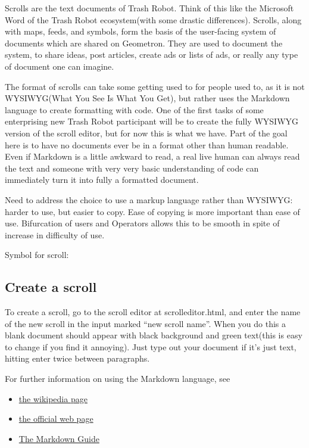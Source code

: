 

Scrolls are the text documents of Trash Robot. Think of this like the
Microsoft Word of the Trash Robot ecosystem(with some drastic
differences). Scrolls, along with maps,
feeds, and symbols, form the basis of the user-facing system of documents which are shared
on Geometron. They are used to document the system, to share ideas, post
articles, create ads or lists of ads, or really any type of document one
can imagine.




The format of scrolls can take some getting used to for people used to,
as it is not WYSIWYG(What You See Is What You Get), but rather uses the
Markdown language to create formatting with code. One of the first tasks
of some enterprising new Trash Robot participant will be to create the
fully WYSIWYG version of the scroll editor, but for now this is what we
have. Part of the goal here is to have no documents ever be in a format
other than human readable. Even if Markdown is a little awkward to read,
a real live human can always read the text and someone with very very
basic understanding of code can immediately turn it into fully a
formatted document.

Need to address the choice to use a markup language rather than WYSIWYG: harder to use, but easier to copy.  Ease of copying is more important than ease of use.  Bifurcation of users and Operators allows this to be smooth in spite of increase in difficulty of use.

Symbol for scroll:


\subsection{Create a scroll}\label{create-a-scroll}

To create a scroll, go to the scroll editor at scrolleditor.html,
and enter the name of the new scroll in the input marked ``new scroll
name''. When you do this a blank document should appear with black
background and green text(this is easy to change if you find it
annoying). Just type out your document if it's just text, hitting enter
twice between paragraphs.

For further information on using the Markdown language, see

\begin{itemize}
\tightlist
\item
  \href{https://en.wikipedia.org/wiki/Markdown}{the wikipedia page}
\item
  \href{https://daringfireball.net/projects/markdown/}{the official web
  page}
\item
  \href{https://www.markdownguide.org/}{The Markdown Guide}
\end{itemize}

